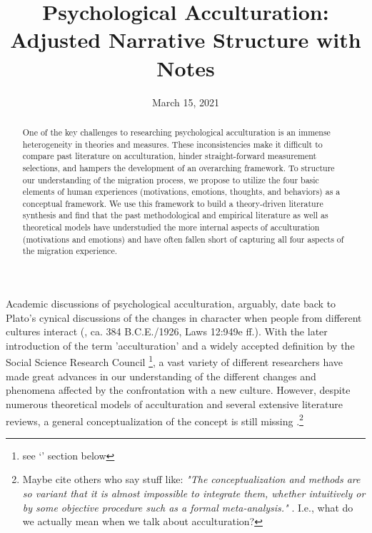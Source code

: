 \documentclass[nobib]{tufte-handout}
\title[Psychological Acculturation - Narrative]{Psychological Acculturation: \\
Adjusted Narrative Structure with Notes}
\author[Kreienkamp et al.]{}
\date{March 15, 2021}  %
\begin{document}
\maketitle %

\begin{abstract}
\noindent{}One of the key challenges to researching psychological acculturation is an immense heterogeneity in theories and measures. These inconsistencies make it difficult to compare past literature on acculturation, hinder straight-forward measurement selections, and hampers the development of an overarching framework. To structure our understanding of the migration process, we propose to utilize the four basic elements of human experiences (motivations, emotions, thoughts, and behaviors) as a conceptual framework. We use this framework to build a theory-driven literature synthesis and find that the past methodological and empirical literature as well as theoretical models have understudied the more internal aspects of acculturation (motivations and emotions) and have often fallen short of capturing all four aspects of the migration experience.
\end{abstract}


 Academic discussions of psychological acculturation, arguably, date back to Plato's cynical discussions of the changes in character when people from different cultures interact (\citeauthor{Plato1926}, ca. 384 B.C.E./1926, Laws 12:949e ff.). With the later introduction of the term 'acculturation' \citep{Powell1880} and a widely accepted definition by the Social Science Research Council \citep{Redfield1936}\footnote{see `' section below}, a vast variety of different researchers have made great advances in our understanding of the different changes and phenomena affected by the confrontation with a new culture. However, despite numerous theoretical models of acculturation and several extensive literature reviews, a general conceptualization of the concept is still missing \citep{Birman2014c}.\footnote{Maybe cite others who say stuff like: \textit{"The conceptualization and methods are so variant that it is almost impossible to integrate them, whether intuitively or by some objective procedure such as a formal meta-analysis."} \citep[p. 343]{Taft1981}. I.e., what do we actually mean when we talk about acculturation?}
\end{document}
